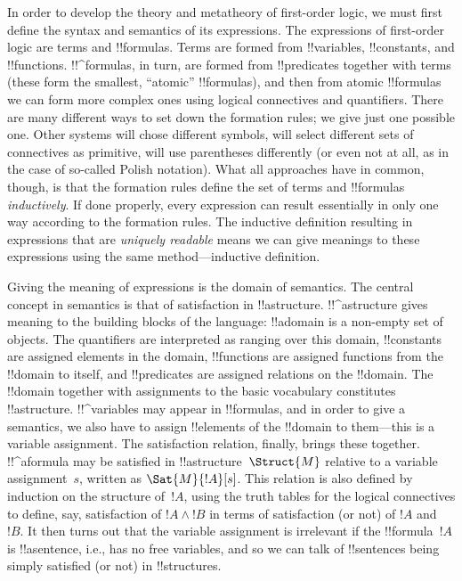 \documentclass[../../../include/open-logic-section]{subfiles}
\begin{document}

In order to develop the theory and metatheory of first-order logic, we
must first define the syntax and semantics of its expressions.  The
expressions of first-order logic are terms and !!{formula}s.  Terms
are formed from !!{variable}s, !!{constant}s, and !!{function}s.
!!^{formula}s, in turn, are formed from !!{predicate}s together with
terms (these form the smallest, ``atomic'' !!{formula}s), and then
from atomic !!{formula}s we can form more complex ones using logical
connectives and quantifiers.  There are many different ways to set
down the formation rules; we give just one possible one. Other systems
will chose different symbols, will select different sets of
connectives as primitive, will use parentheses differently (or even not
at all, as in the case of so-called Polish notation).  What all
approaches have in common, though, is that the formation rules define
the set of terms and !!{formula}s \emph{inductively}. If done
properly, every expression can result essentially in only one way
according to the formation rules.  The inductive definition resulting
in expressions that are \emph{uniquely readable} means we can give
meanings to these expressions using the same method---inductive
definition.

Giving the meaning of expressions is the domain of semantics.  The
central concept in semantics is that of satisfaction in
!!a{structure}. !!^a{structure} gives meaning to the building blocks
of the language: !!a{domain} is a non-empty set of objects. The
quantifiers are interpreted as ranging over this domain, !!{constant}s
are assigned elements in the domain, !!{function}s are assigned
functions from the !!{domain} to itself, and !!{predicate}s are
assigned relations on the !!{domain}.  The !!{domain} together with
assignments to the basic vocabulary constitutes
!!a{structure}. !!^{variable}s may appear in !!{formula}s, and in
order to give a semantics, we also have to assign !!{element}s of the
!!{domain} to them---this is a variable assignment. The satisfaction
relation, finally, brings these together. !!^a{formula} may be satisfied
in !!a{structure}~$\Struct{M}$ relative to a variable assignment~$s$,
written as $\Sat{M}{!A}[s]$. This relation is also defined by
induction on the structure of~$!A$, using the truth tables for the
logical connectives to define, say, satisfaction of $!A \land !B$ in
terms of satisfaction (or not) of $!A$ and ~$!B$.  It then turns out
that the variable assignment is irrelevant if the !!{formula}~$!A$ is
!!a{sentence}, i.e., has no free variables, and so we can talk of
!!{sentence}s being simply satisfied (or not) in !!{structure}s.
\end{document}
